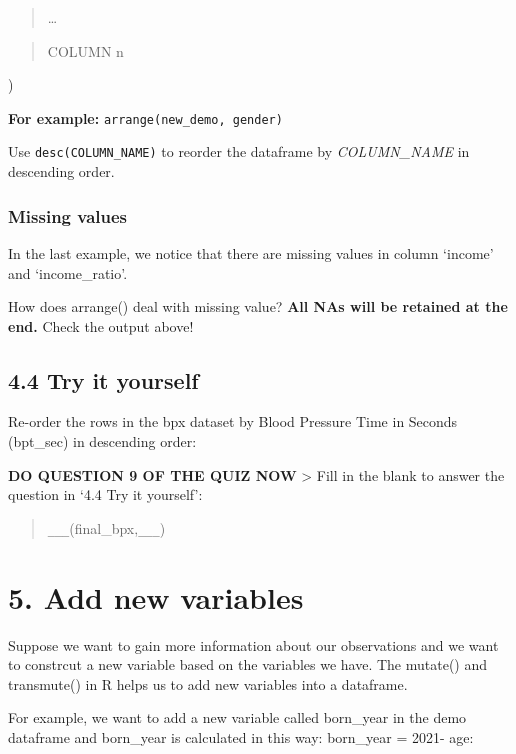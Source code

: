 \documentclass[
]{book}
\begin{document}
\begin{quote}
\ldots{}
\end{quote}

\begin{quote}
COLUMN n
\end{quote}

)

\textbf{For example:} \texttt{arrange(new\_demo,\ gender)}

Use \texttt{desc(COLUMN\_NAME)} to reorder the dataframe by \emph{COLUMN\_NAME} in descending order.

\hypertarget{missing-values-2}{%
\subsubsection{Missing values}\label{missing-values-2}}

In the last example, we notice that there are missing values in column `income' and `income\_ratio'.

How does arrange() deal with missing value? \textbf{All NAs will be retained at the end.} Check the output above!

\hypertarget{try-it-yourself-17}{%
\subsection{4.4 Try it yourself}\label{try-it-yourself-17}}

Re-order the rows in the bpx dataset by Blood Pressure Time in Seconds (bpt\_sec) in descending order:

\textbf{DO QUESTION 9 OF THE QUIZ NOW}
\textgreater{} Fill in the blank to answer the question in `4.4 Try it yourself':

\begin{quote}
\texttt{\_\_\_}(final\_bpx,\texttt{\_\_\_})
\end{quote}

\hypertarget{add-new-variables}{%
\section{5. Add new variables}\label{add-new-variables}}

Suppose we want to gain more information about our observations and we want to constrcut a new variable based on the variables we have. The mutate() and transmute() in R helps us to add new variables into a dataframe.

For example, we want to add a new variable called born\_year in the demo dataframe and born\_year is calculated in this way: born\_year = 2021- age:
\end{document}
